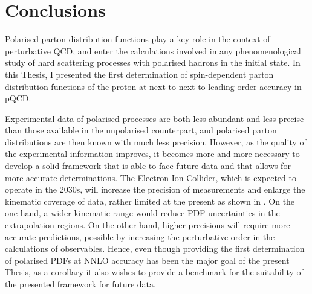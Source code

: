 \chapter{Conclusions}
\label{ch:5}

Polarised parton distribution functions play a key role in the context of perturbative QCD, and enter the calculations involved in any phenomenological study of hard scattering processes with polarised hadrons in the initial state. In this Thesis, I presented the first determination of spin-dependent parton distribution functions of the proton at next-to-next-to-leading order accuracy in pQCD.%

Experimental data of polarised processes are both less abundant and less precise than those available in the unpolarised counterpart, and polarised parton distributions are then known with much less precision. However, as the quality of the experimental information improves, it becomes more and more necessary to develop a solid framework that is able to face future data and that allows for more accurate determinations. The Electron-Ion Collider, which is expected to operate in the 2030s, will increase the precision of measurements and enlarge the kinematic coverage of data, rather limited at the present as shown in . On the one hand, a wider kinematic range would reduce PDF uncertainties in the extrapolation regions. On the other hand, higher precisions will require more accurate predictions, possible by increasing the perturbative order in the calculations of observables. Hence, even though providing the first determination of polarised PDFs at NNLO accuracy has been the major goal of the present Thesis, as a corollary it also wishes to provide a benchmark for the suitability of the presented framework for future data.%

